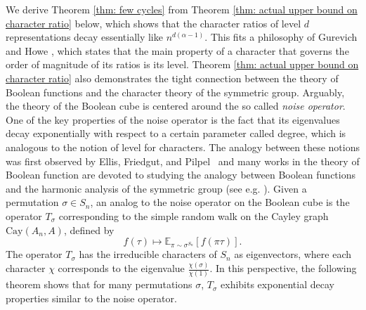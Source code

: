 \documentclass[11pt, letterpaper]{amsart}
\newtheorem{thm}{Theorem}[section]
\newcommand{\remove}[1]{}
\renewcommand\le{\leqslant}
\begin{document}
We derive Theorem \ref{thm: few cycles} from Theorem \ref{thm: actual upper bound on character ratio} below, which shows that the character ratios of level $d$ representations decay essentially like $n^{d(\alpha - 1)}.$ This fits a philosophy of Gurevich and Howe \cite{gurevich2021harmonic}, which states that the main property of a character that governs the order of magnitude of its ratios is its level. Theorem \ref{thm: actual upper bound on character ratio} also demonstrates the tight connection between the theory of Boolean functions and the character theory of the symmetric group. Arguably, the theory of the Boolean cube is centered around the so called \emph{noise operator}. One of the key properties of the noise operator is the fact that its eigenvalues decay exponentially with respect to a certain parameter called degree, which is analogous to the notion of level for characters. The analogy between these notions was first observed by Ellis, Friedgut, and Pilpel~\cite{ellis2011intersecting} and many works in the theory of Boolean function are devoted to studying the analogy between Boolean functions and the harmonic analysis of the symmetric group (see e.g. \cite{dafni2021complexity, ellis2015stability}).
Given a permutation $\sigma \in S_n$, an analog to the noise operator on the Boolean cube is the operator $T_\sigma$ corresponding to the simple random walk on the Cayley graph $\mathrm{Cay}(A_n,A)$, defined by 
\[
f(\tau)\mapsto \mathbb{E}_{\pi \sim \sigma^{S_n}}[f(\pi \tau)]. 
\]
The operator $T_{\sigma}$ has the irreducible characters of $S_n$ as eigenvectors, where each character $\chi$ corresponds to the eigenvalue $\frac{\chi \left(\sigma\right)}{\chi(1)}.$ In this perspective, the following theorem shows that for many permutations $\sigma$, $T_{\sigma}$ exhibits exponential decay properties similar to the noise operator. 
\remove{
then $\frac{\chi(\sigma)}{\chi(1)} \le n^{\alpha -1}.$ 
For a set $A\subseteq S_n$ we call $\frac{A}{n!}$ the \emph{density} of $A$. By the centralizer theorem, the density of $^{S_n}\sigma$ is given by the size of the centralizer of $\sigma$. 


It turns out that we have the following 

We prove the following bound  
\begin{thm}
For each $\zeta>0$ there exists $c>0,$ such that the following holds. Let $\alpha \in(0,1-\zeta)$ and let $\sigma\in S_n$ have a centralizer of size $\le e^{c n^{\alpha}\log n} $ with $\alpha \in(0, 1-\zeta).$ 
Then for every character $\chi$ of $S_n$ of level $d<n^{1-2\zeta}$ we have 
\[\left|\frac{\chi(\sigma)}{\chi(1)}\right| \le n^{d(\alpha -1)}.\]
\end{thm}
}
\end{document}
